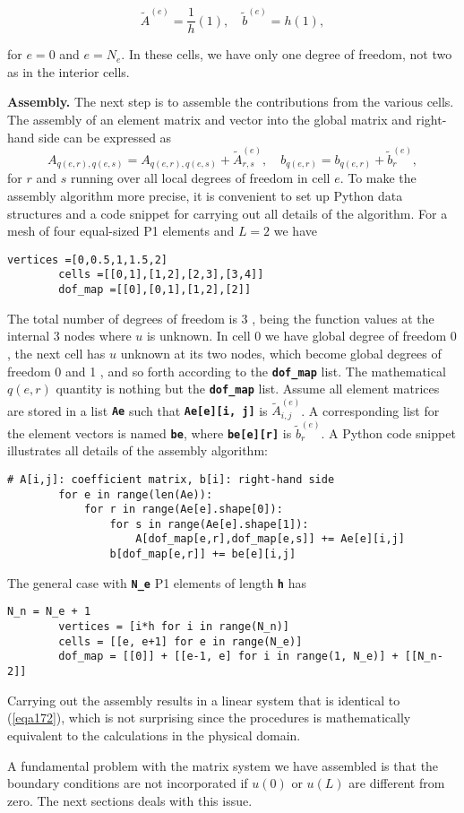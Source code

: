 \documentclass[../main.tex]{subfiles}
\begin{document}
	\begin{equation}
		\label{eqa178}
		\tilde{A}^{(e)}=\frac{1}{h}(1), \quad \tilde{b}^{(e)}=h(1),
	\end{equation}

	for $e=0$ and $e=N_{e}$. In these cells, we have only one degree of freedom, not two as in the interior cells.\bigbreak
	
	\noindent \textbf{Assembly.   } The next step is to assemble the contributions from the various cells. The assembly of an element matrix and vector into the global matrix and right-hand side can be expressed as
	$$
	A_{q(e, r), q(e, s)}=A_{q(e, r), q(e, s)}+\tilde{A}_{r, s}^{(e)}, \quad b_{q(e, r)}=b_{q(e, r)}+\tilde{b}_{r}^{(e)},
	$$
	for $r$ and $s$ running over all local degrees of freedom in cell $e$.\smallbreak
	To make the assembly algorithm more precise, it is convenient to set up Python data structures and a code snippet for carrying out all details of the algorithm. For a mesh of four equal-sized P1 elements and $L=2$ we have
	\begin{lstlisting}[numbers=none]
		vertices =[0,0.5,1,1.5,2]
		cells =[[0,1],[1,2],[2,3],[3,4]]
		dof_map =[[0],[0,1],[1,2],[2]]
	\end{lstlisting}
	The total number of degrees of freedom is 3 , being the function values at the internal 3 nodes where $u$ is unknown. In cell 0 we have global degree of freedom 0 , the next cell has $u$ unknown at its two nodes, which become global degrees of freedom 0 and 1 , and so forth according to the \textbf{\texttt{dof\_map}} list. The mathematical $q(e, r)$ quantity is nothing but the \textbf{\texttt{dof\_map}} list.
	Assume all element matrices are stored in a list \textbf{\texttt{Ae}} such that \textbf{\texttt{Ae[e][i, j]}} is $\tilde{A}_{i, j}^{(e)}$. A corresponding list for the element vectors is named \textbf{\texttt{be}}, where \textbf{\texttt{be[e][r]}} is $\tilde{b}_{r}^{(e)}$. A Python code snippet illustrates all details of the assembly algorithm:
	\begin{lstlisting}[numbers=none]
		# A[i,j]: coefficient matrix, b[i]: right-hand side
		for e in range(len(Ae)):
			for r in range(Ae[e].shape[0]):
				for s in range(Ae[e].shape[1]):
					A[dof_map[e,r],dof_map[e,s]] += Ae[e][i,j]
				b[dof_map[e,r]] += be[e][i,j]
	\end{lstlisting}
	
	The general case with \textbf{\texttt{N\_e}} P1 elements of length \textbf{\texttt{h}} has
	\begin{lstlisting}[numbers=none]
		N_n = N_e + 1
		vertices = [i*h for i in range(N_n)]
		cells = [[e, e+1] for e in range(N_e)]
		dof_map = [[0]] + [[e-1, e] for i in range(1, N_e)] + [[N_n-2]]
	\end{lstlisting} \smallbreak
	Carrying out the assembly results in a linear system that is identical to (\ref{eqa172}), which is not surprising since the procedures is mathematically equivalent to the calculations in the physical domain.
	
	A fundamental problem with the matrix system we have assembled is that the boundary conditions are not incorporated if $u(0)$ or $u(L)$ are different from zero. The next sections deals with this issue.

\clearpage
\end{document}
